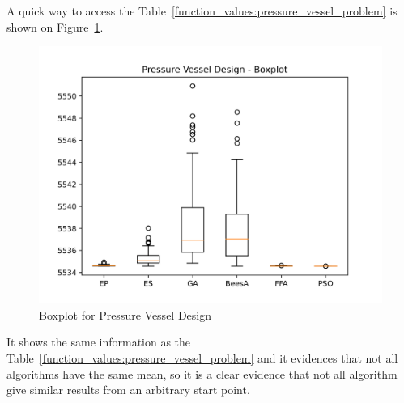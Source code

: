 A quick way to access the Table~\ref{function_values:pressure_vessel_problem} is shown on Figure~\ref{fig:pressure_vessel_design_boxplot}.

\begin{figure}[H]
\centering
\caption{Boxplot for Pressure Vessel Design}
\label{fig:pressure_vessel_design_boxplot}
\includegraphics[scale=0.5]{images/pressure_vessel_problem_boxplot.png}
\end{figure}

It shows the same information as the Table~\ref{function_values:pressure_vessel_problem}
and it evidences that not all algorithms have the same mean, so it is a clear evidence
that not all algorithm give similar results from an arbitrary start point.